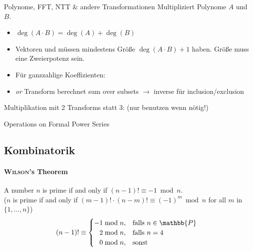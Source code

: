 \begin{algorithm}{Polynome, FFT, NTT \& andere Transformationen}
	\label{fft}
	Multipliziert Polynome $A$ und $B$.
	\begin{itemize}
		\item $\deg(A \cdot B) = \deg(A) + \deg(B)$
		\item Vektoren  und  müssen mindestens Größe
		$\deg(A \cdot B) + 1$ haben.
		Größe muss eine Zweierpotenz sein.
		\item Für ganzzahlige Koeffizienten: 
		\item \emph{or} Transform berechnet sum over subsets
			$\rightarrow$ inverse für inclusion/exclusion
	\end{itemize}
	Multiplikation mit 2 Transforms statt 3: (nur benutzen wenn nötig!)
\end{algorithm}

\begin{algorithm}{Operations on Formal Power Series}
\end{algorithm}

\subsection{Kombinatorik}

\paragraph{\textsc{Wilson}'s Theorem}
A number $n$ is prime if and only if
$(n-1)!\equiv -1\bmod{n}$.\\
($n$ is prime if and only if $(m-1)!\cdot(n-m)!\equiv(-1)^m\bmod{n}$ for all $m$ in $\{1,\dots,n\}$)
\begin{align*}
	(n-1)!\equiv\begin{cases}
		-1\bmod{n},&\mathrm{falls}~n \in \mathbb{P}\\
		\hphantom{-}2\bmod{n},&\mathrm{falls}~n = 4\\
		\hphantom{-}0\bmod{n},&\mathrm{sonst}
	\end{cases}
\end{align*}

